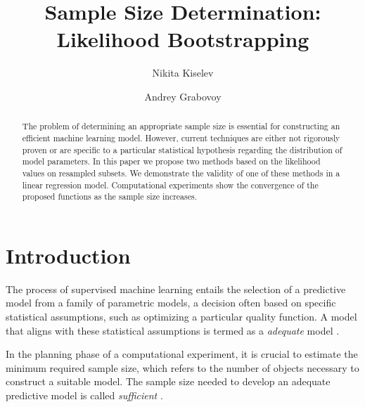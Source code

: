 \documentclass[runningheads]{llncs}
\begin{document}
%
\title{Sample Size Determination:\\Likelihood Bootstrapping}
%
%
\author{Nikita Kiselev \and Andrey Grabovoy}
%
%
%
\maketitle %
%
\begin{abstract}
The problem of determining an appropriate sample size is essential for constructing an efficient machine learning model. However, current techniques are either not rigorously proven or are specific to a particular statistical hypothesis regarding the distribution of model parameters. In this paper we propose two methods based on the likelihood values on resampled subsets. We demonstrate the validity of one of these methods in a linear regression model. Computational experiments show the convergence of the proposed functions as the sample size increases.

\end{abstract}
%
%
%
\section{Introduction}
The process of supervised machine learning entails the selection of a predictive model from a family of parametric models, a decision often based on specific statistical assumptions, such as optimizing a particular quality function. A model that aligns with these statistical assumptions is termed as a \textit{adequate} model \cite{bies2006genetic,cawley2010over}.

In the planning phase of a computational experiment, it is crucial to estimate the minimum required sample size, which refers to the number of objects necessary to construct a suitable model. The sample size needed to develop an adequate predictive model is called \textit{sufficient} \cite{byrd2012sample,figueroa2012predicting,balki2019sample}. 
\end{document}
